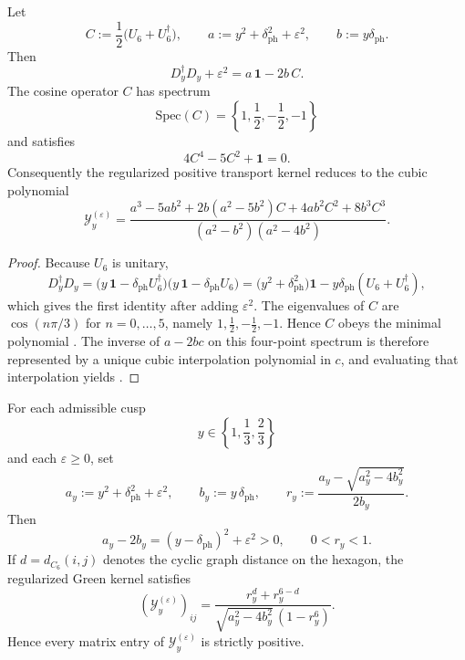 
\begin{proposition}
\label{prop:finite-positive-transport-algebra}
Let
\[
C:=\frac12\bigl(U_6+U_6^\dagger\bigr),
\qquad
a:=y^2+\delta_{\mathrm{ph}}^2+\varepsilon^2,
\qquad
b:=y\delta_{\mathrm{ph}}.
\]
Then
\[
D_y^\dagger D_y+\varepsilon^2=a\,\mathbf 1-2b\,C.
\]
The cosine operator $C$ has spectrum
\[
\mathrm{Spec}(C)=\left\{1,\frac12,-\frac12,-1\right\}
\]
and satisfies
\begin{equation}
\label{eq:c6-cosine-polynomial}
4C^4-5C^2+\mathbf 1=0.
\end{equation}
Consequently the regularized positive transport kernel reduces to the cubic polynomial
\begin{equation}
\label{eq:finite-positive-transport-kernel}
\mathcal Y_y^{(\varepsilon)}
=
\frac{
a^3-5ab^2
+2b(a^2-5b^2)C
+4ab^2C^2
+8b^3C^3
}{
(a^2-b^2)(a^2-4b^2)
}.
\end{equation}
\end{proposition}

\begin{proof}
Because $U_6$ is unitary,
\[
D_y^\dagger D_y
=
\bigl(y\,\mathbf 1-\delta_{\mathrm{ph}}U_6^\dagger\bigr)
\bigl(y\,\mathbf 1-\delta_{\mathrm{ph}}U_6\bigr)
=
\bigl(y^2+\delta_{\mathrm{ph}}^2\bigr)\mathbf 1
-y\delta_{\mathrm{ph}}(U_6+U_6^\dagger),
\]
which gives the first identity after adding $\varepsilon^2$. The eigenvalues of $C$ are $\cos(n\pi/3)$ for $n=0,\dots,5$, namely $1,\frac12,-\frac12,-1$. Hence $C$ obeys the minimal polynomial . The inverse of $a-2bc$ on this four-point spectrum is therefore represented by a unique cubic interpolation polynomial in $c$, and evaluating that interpolation yields .
\end{proof}

\begin{proposition}
\label{prop:strict-positive-c6-green}
For each admissible cusp
\[
y\in\left\{1,\frac13,\frac23\right\}
\]
and each $\varepsilon\ge 0$, set
\[
a_y:=y^2+\delta_{\mathrm{ph}}^2+\varepsilon^2,
\qquad
b_y:=y\,\delta_{\mathrm{ph}},
\qquad
r_y:=\frac{a_y-\sqrt{a_y^2-4b_y^2}}{2b_y}.
\]
Then
\[
a_y-2b_y=(y-\delta_{\mathrm{ph}})^2+\varepsilon^2>0,
\qquad
0<r_y<1.
\]
If $d=d_{C_6}(i,j)$ denotes the cyclic graph distance on the hexagon, the regularized Green
kernel satisfies
\[
(\mathcal Y_y^{(\varepsilon)})_{ij}
=
\frac{r_y^{d}+r_y^{6-d}}
{\sqrt{a_y^2-4b_y^2}\,(1-r_y^6)}.
\]
Hence every matrix entry of $\mathcal Y_y^{(\varepsilon)}$ is strictly positive.
\end{proposition}

